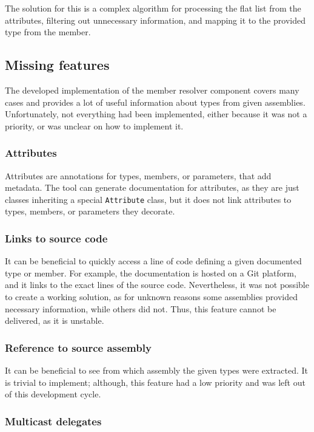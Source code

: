 The solution for this is a complex algorithm for processing the flat list from the attributes, filtering out unnecessary information, and mapping it to the provided type from the member.

\subsection{Missing features}

The developed implementation of the member resolver component covers many cases and provides a lot of useful information about types from given assemblies. Unfortunately, not everything had been implemented, either because it was not a priority, or was unclear on how to implement it.

\subsubsection{Attributes}

Attributes are annotations for types, members, or parameters, that add metadata. The tool can generate documentation for attributes, as they are just classes inheriting a special \lstinline[language=csh]{Attribute} class, but it does not link attributes to types, members, or parameters they decorate.

\subsubsection{Links to source code}

It can be beneficial to quickly access a line of code defining a given documented type or member. For example, the documentation is hosted on a Git platform, and it links to the exact lines of the source code. Nevertheless, it was not possible to create a working solution, as for unknown reasons some assemblies provided necessary information, while others did not. Thus, this feature cannot be delivered, as it is unstable.

\subsubsection{Reference to source assembly}

It can be beneficial to see from which assembly the given types were extracted. It is trivial to implement; although, this feature had a low priority and was left out of this development cycle.

\subsubsection{Multicast delegates}

